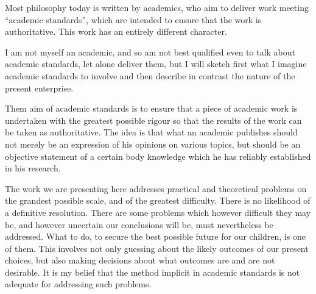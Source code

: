 Most philosophy today is written by academics, who aim to deliver work meeting ``academic standards'', which are intended to ensure that the work is authoritative.
This work has an entirely different character.

I am not myself an academic, and so am not best qualified even to talk about academic standards, let alone deliver them, but I will sketch first what I imagine academic standards to involve and then describe in contrast the nature of the present enterprise.

Them aim of academic standards is to ensure that a piece of academic work is undertaken with the greatest possible rigour so that the results of the work can be taken as authoritative.
The idea is that what an academic publishes should not merely be an expression of his opinions on various topics, but should be an objective statement of a certain body knowledge which he has reliably established in his research.

The work we are presenting here addresses practical and theoretical problems on the grandest possible scale, and of the greatest difficulty.
There is no likelihood of a definitive resolution.
There are some problems which however difficult they may be, and however uncertain our conclusions will be, must nevertheless be addressed.
What to do, to secure the best possible future for our children, is one of them.
This involves not only guessing about the likely outcomes of our present choices, but also making decisions about what outcomes are and are not desirable.
It is my belief that the method implicit in academic standards is not adequate for addressing such problems.















